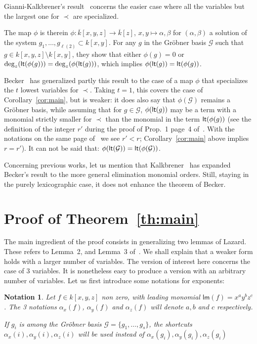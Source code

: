 \documentclass[a4paper,11pt]{article}
\newcommand{\conj}[1]{\ensuremath{{\overline{#1}}}}
\def\G{\ensuremath{\mathcal{G}}}
\def\lm{\ensuremath{{\mathsf{lm}}}}
\def\lt{\ensuremath{{\sf lt}}}
\newtheorem{Not}{Notation}
\begin{document}
Gianni-Kalkbrener's result~\cite{Gi87,Ka87} concerns the easier
case where all the variables but the largest one for $\prec$ are specialized.
\smallskip

The map $\phi$ is therein $\phi : \conj{k}[x,y,z]\rightarrow
\conj{k}[z]$, $x,y\mapsto\alpha,\beta$
 for $(\alpha,\beta)$
a solution of the system $g_1,\ldots,g_{\ell(2)}\subset k[x,y]$.
For any $g$ in the Gr\"obner basis $\G$
such that $g\in k[x,y,z]\setminus k[x,y]$,
they show that either $\phi(g)=0$ or
$\deg_z(\lt(\phi(g))) = \deg_z(\phi(\lt(g)))$,
which implies
$\phi(\lt(g)) = \lt(\phi(g))$.
\smallskip


Becker~\cite{Be94} has generalized partly this result to the case
of a map $\phi$ that specializes the $t$ lowest variables
for $\prec$. Taking $t=1$, this covers the case of Corollary~\ref{cor:main},
but is weaker: it does also say that $\phi(\G)$ remains a Gr\"obner basis,
while assuming that for $g\in \G$,
$\phi(\lt(g))$ may be a term with a monomial
strictly smaller for $\prec$ than the monomial in the term $\lt(\phi(g))$ (see the definition
of the integer $r'$ during the proof of Prop.~1  page~4
of~\cite{Be94}.
With the notations on the same page of~\cite{Be94} we see $r'<r$;
Corollary~\ref{cor:main} above implies $r=r'$).
It can not be said that: $\phi(\lt(\G)) =\lt (\phi (\G))$. 

Concerning  previous works, let us mention that Kalkbrener~\cite{Ka97}
has expanded Becker's result to the more general elimination monomial
orders. Still, staying in the purely lexicographic case,
it does not enhance  the theorem of Becker.

\section{Proof of Theorem~\ref{th:main}}
The main ingredient of the proof consists in generalizing two lemmas of Lazard.
These refers to Lemma~2, and Lemma~3 of~\cite{Laz85}.
We shall explain that a weaker form holds with a larger
number of variables.
The version of interest here concerns the case of 3 variables.
It is nonetheless easy to produce a version with an arbitrary number
of variables.
Let us first introduce some notations
for exponents:
\begin{Not}
Let $f\in k[x,y,z]$ non zero, with leading monomial
$\lm(f)=x^ay^bz^c$. The 3 notations $\alpha_x(f)$,
$\alpha_y(f)$ and $\alpha_z(f)$ will denote
$a,b$ and $c$ respectively.

If $g_i$ is among the Gr\"obner basis $\G=\{g_1,\ldots,g_s\}$,
the shortcuts $\alpha_x(i),\alpha_y(i),\alpha_z(i)$
will be used instead of $\alpha_x(g_i),\alpha_y(g_i),\alpha_z(g_i)$
\end{Not}
\end{document}
